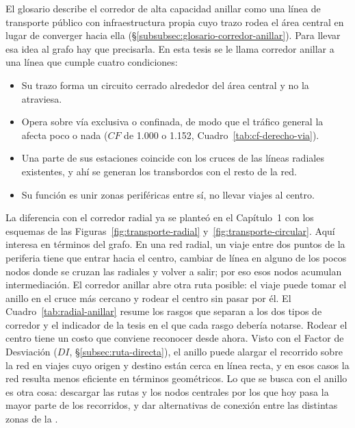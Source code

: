 El glosario describe el corredor de alta capacidad anillar como una línea de
transporte público con infraestructura propia cuyo trazo rodea el área central
en lugar de converger hacia ella (§\ref{subsubsec:glosario-corredor-anillar}).
Para llevar esa idea al grafo hay que precisarla. En esta tesis se le llama
corredor anillar a una línea que cumple cuatro condiciones:

\begin{itemize}
    \item Su trazo forma un circuito cerrado alrededor del área central y no la
    atraviesa.
    \item Opera sobre vía exclusiva o confinada, de modo que el tráfico general
    la afecta poco o nada ($CF$ de 1.000 o 1.152,
    Cuadro~\ref{tab:cf-derecho-via}).
    \item Una parte de sus estaciones coincide con los cruces de las líneas
    radiales existentes, y ahí se generan los transbordos con el resto de la
    red.
    \item Su función es unir zonas periféricas entre sí, no llevar viajes al
    centro.
\end{itemize}

La diferencia con el corredor radial ya se planteó en el Capítulo~1 con los
esquemas de las Figuras~\ref{fig:transporte-radial}
y~\ref{fig:transporte-circular}. Aquí interesa en términos del grafo. En una
red radial, un viaje entre dos puntos de la periferia tiene que entrar hacia el
centro, cambiar de línea en alguno de los pocos nodos donde se cruzan las
radiales y volver a salir; por eso esos nodos acumulan intermediación. El
corredor anillar abre otra ruta posible: el viaje puede tomar el anillo en el
cruce más cercano y rodear el centro sin pasar por él. El
Cuadro~\ref{tab:radial-anillar} resume los rasgos que separan a los dos tipos de
corredor y el indicador de la tesis en el que cada rasgo debería notarse.
Rodear el centro tiene un costo que conviene reconocer desde ahora. Visto con
el Factor de Desviación ($DI$, §\ref{subsec:ruta-directa}), el anillo puede
alargar el recorrido sobre la red en viajes cuyo origen y destino están cerca
en línea recta, y en esos casos la red resulta menos eficiente en términos
geométricos. Lo que se busca con el anillo es otra cosa: descargar las rutas y
los nodos centrales por los que hoy pasa la mayor parte de los recorridos, y
dar alternativas de conexión entre las distintas zonas de la \zmvm{}.

